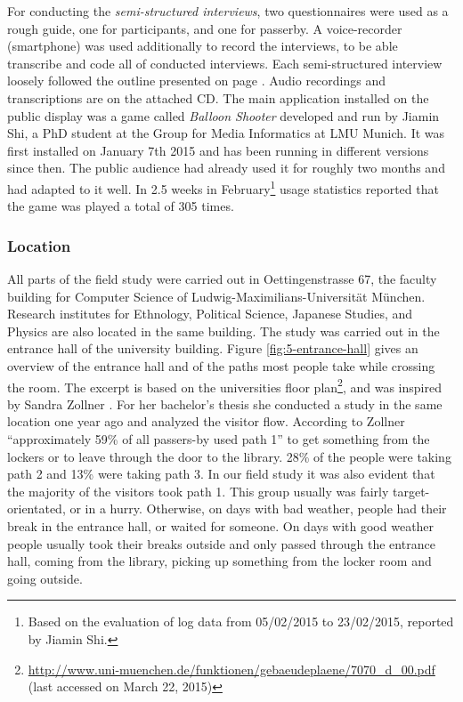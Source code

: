 		For conducting the \textit{semi-structured interviews}, two questionnaires were used as a rough guide, one for participants, and one for passerby. A voice-recorder (smartphone) was used additionally to record the interviews, to be able transcribe and code all of conducted interviews. Each semi-structured interview loosely followed the outline presented on page \pageref{appendix:semi-structured-interview}. Audio recordings and transcriptions are on the attached CD.
		The main application installed on the public display was a game called \textit{Balloon Shooter} developed and run by Jiamin Shi, a PhD student at the Group for Media Informatics at LMU Munich. It was first installed on January 7th 2015 and has been running in different versions since then. The public audience had already used it for roughly two months and had adapted to it well. In 2.5 weeks in February\footnote{Based on the evaluation of log data from 05/02/2015 to 23/02/2015, reported by Jiamin Shi.} usage statistics reported that the game was played a total of 305 times.



	\subsubsection{Location}

		All parts of the field study were carried out in Oettingenstrasse 67, the faculty building for Computer Science of Ludwig-Maximilians-Universit\"at M\"unchen. Research institutes for Ethnology, Political Science, Japanese Studies, and Physics are also located in the same building. The study was carried out in the entrance hall of the university building. Figure \ref{fig:5-entrance-hall} gives an overview of the entrance hall and of the paths most people take while crossing the room. The excerpt is based on the universities floor plan\footnote{\url{http://www.uni-muenchen.de/funktionen/gebaeudeplaene/7070_d_00.pdf} (last accessed on March 22, 2015)}, and was inspired by Sandra Zollner \cite{zollner2014thesis}. For her bachelor's thesis she conducted a study in the same location one year ago and analyzed the visitor flow. According to Zollner ``approximately 59\% of all passers-by used path 1'' to get something from the lockers or to leave through the door to the library. 28\% of the people were taking path 2 and 13\% were taking path 3.
		In our field study it was also evident that the majority of the visitors took path 1. This group usually was fairly target-orientated, or in a hurry. Otherwise, on days with bad weather, people had their break in the entrance hall, or waited for someone. On days with good weather people usually took their breaks outside and only passed through the entrance hall, coming from the library, picking up something from the locker room and going outside.

